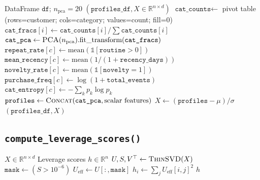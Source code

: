 \documentclass[11pt,a4paper]{article}
\begin{document}
\begin{algorithm}[H]
\caption{\textsc{BuildCustomerProfiles}}\label{alg:build-profiles}
\begin{algorithmic}[1]
\Require DataFrame $\texttt{df}$; $n_{\text{pca}} = 20$
\Ensure $(\texttt{profiles\_df}, X \in \mathbb{R}^{n \times d})$
\State \hspace{2em} $\texttt{cat\_counts} \gets$ pivot table (rows=customer; cols=category; values=count; fill=0)
\State \hspace{2em} $\texttt{cat\_fracs}[i] \gets \texttt{cat\_counts}[i] / \sum \texttt{cat\_counts}[i]$
\State \hspace{2em} $\texttt{cat\_pca} \gets \Call{PCA}{n_{\text{pca}}}.\text{fit\_transform}(\texttt{cat\_fracs})$
    \State \hspace{2em} \hspace{2em} $\texttt{repeat\_rate}[c] \gets \text{mean}(\mathbb{1}[\texttt{routine} > 0])$
    \State \hspace{2em} \hspace{2em} $\texttt{mean\_recency}[c] \gets \text{mean}(1 / (1 + \texttt{recency\_days}))$
    \State \hspace{2em} \hspace{2em} $\texttt{novelty\_rate}[c] \gets \text{mean}(\mathbb{1}[\texttt{novelty} = 1])$
    \State \hspace{2em} \hspace{2em} $\texttt{purchase\_freq}[c] \gets \log(1 + \texttt{total\_events})$
    \State \hspace{2em} \hspace{2em} $\texttt{cat\_entropy}[c] \gets -\sum_k p_k \log p_k$
\EndFor
\State \hspace{2em} $\texttt{profiles} \gets \Call{Concat}{\texttt{cat\_pca}, \text{scalar features}}$
\State \hspace{2em} $X \gets (\texttt{profiles} - \mu) / \sigma$ 
\State \Return $(\texttt{profiles\_df}, X)$
\end{algorithmic}
\end{algorithm}

\subsection{\texttt{compute\_leverage\_scores()}}

\begin{algorithm}[H]
\caption{\textsc{ComputeLeverageScores}}\label{alg:leverage}
\begin{algorithmic}[1]
\Require $X \in \mathbb{R}^{n \times d}$
\Ensure Leverage scores $h \in \mathbb{R}^n$
\State $U, S, V^\top \gets \Call{ThinSVD}{X}$
\State $\texttt{mask} \gets (S > 10^{-6})$
\State $U_{\text{eff}} \gets U[:, \texttt{mask}]$
\State $h_i \gets \sum_j U_{\text{eff}}[i, j]^2$ 
\State \Return $h$
\end{algorithmic}
\end{algorithm}
\end{document}
